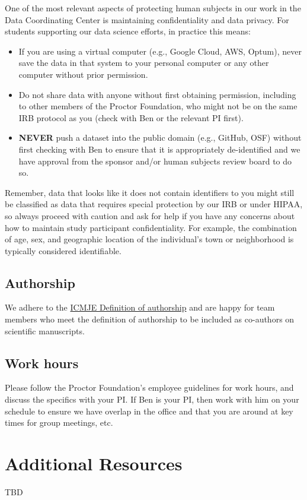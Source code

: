 \documentclass[
]{book}
\providecommand{\tightlist}{%
  \setlength{\itemsep}{0pt}\setlength{\parskip}{0pt}}
\begin{document}
One of the most relevant aspects of protecting human subjects in our work in the Data Coordinating Center is maintaining confidentiality and data privacy. For students supporting our data science efforts, in practice this means:

\begin{itemize}
\tightlist
\item
  If you are using a virtual computer (e.g., Google Cloud, AWS, Optum), never save the data in that system to your personal computer or any other computer without prior permission.
\item
  Do not share data with anyone without first obtaining permission, including to other members of the Proctor Foundation, who might not be on the same IRB protocol as you (check with Ben or the relevant PI first).
\item
  \textbf{NEVER} push a dataset into the public domain (e.g., GitHub, OSF) without first checking with Ben to ensure that it is appropriately de-identified and we have approval from the sponsor and/or human subjects review board to do so.
\end{itemize}

Remember, data that looks like it does not contain identifiers to you might still be classified as data that requires special protection by our IRB or under HIPAA, so always proceed with caution and ask for help if you have any concerns about how to maintain study participant confidentiality. For example, the combination of age, sex, and geographic location of the individual's town or neighborhood is typically considered identifiable.

\section{Authorship}\label{authorship}

We adhere to the \href{http://www.icmje.org/recommendations/browse/roles-and-responsibilities/defining-the-role-of-authors-and-contributors.html}{ICMJE Definition of authorship} and are happy for team members who meet the definition of authorship to be included as co-authors on scientific manuscripts.

\section{Work hours}\label{work-hours}

Please follow the Proctor Foundation's employee guidelines for work hours, and discuss the specifics with your PI. If Ben is your PI, then work with him on your schedule to ensure we have overlap in the office and that you are around at key times for group meetings, etc.

\chapter{Additional Resources}\label{resources}

TBD

  
\end{document}
